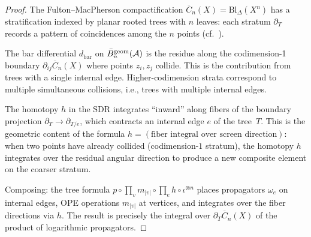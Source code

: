 \begin{proof}
The Fulton--MacPherson compactification
$\overline{C}_n(X) = \mathrm{Bl}_{\Delta}(X^n)$ has a stratification
indexed by planar rooted trees with $n$ leaves: each stratum
$\partial_T$ records a pattern of coincidences among the $n$ points
(cf.\ \cite{FM94}).

The bar differential $d_{\mathrm{bar}}$ on
$\bar{B}^{\mathrm{geom}}_n(\mathcal{A})$ is the residue along the codimension-1
boundary $\partial_{ij}\overline{C}_n(X)$ where points $z_i, z_j$
collide.  This is the contribution from trees with a single
internal edge.  Higher-codimension strata correspond to multiple
simultaneous collisions, i.e., trees with multiple internal edges.

The homotopy $h$ in the SDR integrates ``inward'' along fibers of the
boundary projection $\partial_T \to \partial_{T/e}$, which contracts
an internal edge $e$ of the tree~$T$.  This is the geometric
content of the formula $h = (\text{fiber integral over screen
direction})$: when two points have already collided (codimension-$1$
stratum), the homotopy $h$ integrates over the residual angular
direction to produce a new composite element on the coarser stratum.

Composing: the tree formula $p \circ \prod_v m_{|v|} \circ
\prod_e h \circ \iota^{\otimes n}$ places propagators $\omega_e$
on internal edges, OPE operations $m_{|v|}$ at vertices, and
integrates over the fiber directions via $h$.  The result is
precisely the integral over $\partial_T\overline{C}_n(X)$ of the
product of logarithmic propagators.
\end{proof}

